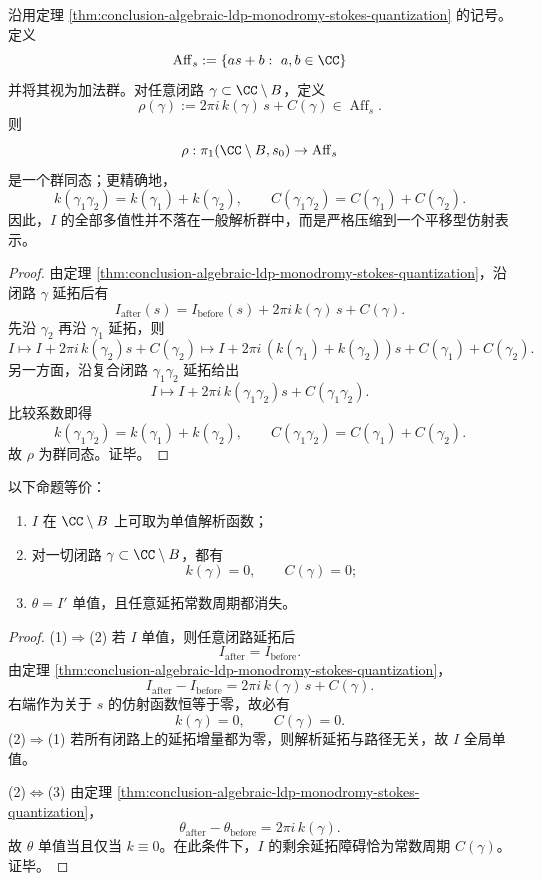 \begin{theorem}\label{thm:conclusion-algebraic-ldp-affine-monodromy-representation}
沿用定理 \ref{thm:conclusion-algebraic-ldp-monodromy-stokes-quantization} 的记号。定义
\[
\operatorname{Aff}_s:=\{as+b:\ a,b\in\CC\}
\]
并将其视为加法群。对任意闭路 \(\gamma\subset \CC\setminus B\)，定义
\[
\rho(\gamma):=2\pi i\,k(\gamma)\,s+C(\gamma)\in \operatorname{Aff}_s.
\]
则
\[
\rho:\pi_1(\CC\setminus B,s_0)\to \operatorname{Aff}_s
\]
是一个群同态；更精确地，
\[
k(\gamma_1\gamma_2)=k(\gamma_1)+k(\gamma_2),
\qquad
C(\gamma_1\gamma_2)=C(\gamma_1)+C(\gamma_2).
\]
因此，\(I\) 的全部多值性并不落在一般解析群中，而是严格压缩到一个平移型仿射表示。
\end{theorem}
\begin{proof}
由定理 \ref{thm:conclusion-algebraic-ldp-monodromy-stokes-quantization}，沿闭路 \(\gamma\) 延拓后有
\[
I_{\mathrm{after}}(s)=I_{\mathrm{before}}(s)+2\pi i\,k(\gamma)\,s+C(\gamma).
\]
先沿 \(\gamma_2\) 再沿 \(\gamma_1\) 延拓，则
\[
I\mapsto I+2\pi i\,k(\gamma_2)s+C(\gamma_2)
\mapsto
I+2\pi i\,(k(\gamma_1)+k(\gamma_2))s+C(\gamma_1)+C(\gamma_2).
\]
另一方面，沿复合闭路 \(\gamma_1\gamma_2\) 延拓给出
\[
I\mapsto I+2\pi i\,k(\gamma_1\gamma_2)s+C(\gamma_1\gamma_2).
\]
比较系数即得
\[
k(\gamma_1\gamma_2)=k(\gamma_1)+k(\gamma_2),
\qquad
C(\gamma_1\gamma_2)=C(\gamma_1)+C(\gamma_2).
\]
故 \(\rho\) 为群同态。证毕。
\end{proof}

\begin{theorem}[大偏差势单值化的充要判据]\label{thm:conclusion-algebraic-ldp-singlevaluedness-criterion}
以下命题等价：
\begin{enumerate}
  \item \(I\) 在 \(\CC\setminus B\) 上可取为单值解析函数；
  \item 对一切闭路 \(\gamma\subset \CC\setminus B\)，都有
  \[
  k(\gamma)=0,
  \qquad
  C(\gamma)=0;
  \]
  \item \(\theta=I'\) 单值，且任意延拓常数周期都消失。
\end{enumerate}
\end{theorem}
\begin{proof}
\textup{(1)\(\Rightarrow\)(2)} 若 \(I\) 单值，则任意闭路延拓后
\[
I_{\mathrm{after}}=I_{\mathrm{before}}.
\]
由定理 \ref{thm:conclusion-algebraic-ldp-monodromy-stokes-quantization}，
\[
I_{\mathrm{after}}-I_{\mathrm{before}}=2\pi i\,k(\gamma)\,s+C(\gamma).
\]
右端作为关于 \(s\) 的仿射函数恒等于零，故必有
\[
k(\gamma)=0,
\qquad
C(\gamma)=0.
\]
\textup{(2)\(\Rightarrow\)(1)} 若所有闭路上的延拓增量都为零，则解析延拓与路径无关，故 \(I\) 全局单值。

\textup{(2)\(\Leftrightarrow\)(3)} 由定理 \ref{thm:conclusion-algebraic-ldp-monodromy-stokes-quantization}，
\[
\theta_{\mathrm{after}}-\theta_{\mathrm{before}}=2\pi i\,k(\gamma).
\]
故 \(\theta\) 单值当且仅当 \(k\equiv 0\)。在此条件下，\(I\) 的剩余延拓障碍恰为常数周期 \(C(\gamma)\)。证毕。
\end{proof}

